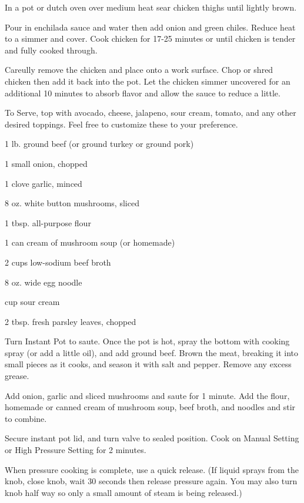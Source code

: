 \documentclass{cookbook}
\begin{document}
In a pot or dutch oven over medium heat sear chicken thighs until lightly brown.

Pour in enchilada sauce and water then add onion and green chiles. Reduce heat to a simmer and cover. Cook chicken for 17-25 minutes or until chicken is tender and fully cooked through.

Careully remove the chicken and place onto a work surface. Chop or shred chicken then add it back into the pot. Let the chicken simmer uncovered for an additional 10 minutes to absorb flavor and allow the sauce to reduce a little.

To Serve, top with avocado, cheese, jalapeno, sour cream, tomato, and any other desired toppings. Feel free to customize these to your preference.


\begin{ingredients}
    \item 1 lb. ground beef (or ground turkey or ground pork)
    \item 1 small onion, chopped
    \item 1 clove garlic, minced
    \item 8 oz. white button mushrooms, sliced
    \item 1 tbsp. all-purpose flour
    \item 1 can cream of mushroom soup (or homemade)
    \item 2  cups low-sodium beef broth
    \item 8 oz. wide egg noodle
    \item {} cup sour cream
    \item 2 tbsp. fresh parsley leaves, chopped
\end{ingredients}

Turn Instant Pot to saute. Once the pot is hot, spray the bottom with cooking spray (or add a little oil), and add ground beef. Brown the meat, breaking it into small pieces as it cooks, and season it with salt and pepper. Remove any excess grease.

Add onion, garlic and sliced mushrooms and saute for 1 minute. Add the flour, homemade or canned cream of mushroom soup, beef broth, and noodles and stir to combine.

Secure instant pot lid, and turn valve to sealed position. Cook on Manual Setting or High Pressure Setting for 2 minutes.

When pressure cooking is complete, use a quick release. (If liquid sprays from the knob, close knob, wait 30 seconds then release pressure again. You may also turn knob half way so only a small amount of steam is being released.)
\end{document}
